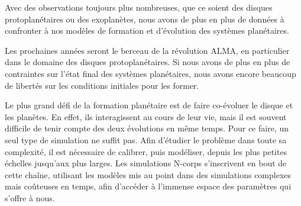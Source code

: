 \bigskip

Avec des observations toujours plus nombreuses, que ce soient des disques protoplanétaires ou des exoplanètes, nous avons de plus en plus de données à confronter à nos modèles de formation et d'évolution des systèmes planétaires. 

Les prochaines années seront le berceau de la révolution ALMA, en particulier dans le domaine des disques protoplanétaires. Si nous avons de plus en plus de contraintes sur l'état final des systèmes planétaires, nous avons encore beaucoup de libertés sur les conditions initiales pour les former. 

Le plus grand défi de la formation planétaire est de faire co-évoluer le disque et les planètes. En effet, ils interagissent au cours de leur vie, mais il est souvent difficile de tenir compte des deux évolutions en même temps. Pour ce faire, un seul type de simulation ne suffit pas. Afin d'étudier le problème dans toute sa complexité, il est nécessaire de calibrer, puis modéliser, depuis les plus petites échelles jusqu'aux plus larges. Les simulations N-corps s'inscrivent en bout de cette chaîne, utilisant les modèles mis au point dans des simulations complexes mais coûteuses en temps, afin d'accéder à l'immense espace des paramètres qui s'offre à nous.
